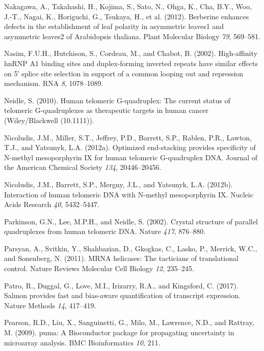 \documentclass[12pt,a4paper,]{report}
\begin{document}
\leavevmode\hypertarget{ref-Nakagawa2012}{}%
Nakagawa, A., Takahashi, H., Kojima, S., Sato, N., Ohga, K., Cha, B.Y.,
Woo, J.-T., Nagai, K., Horiguchi, G., Tsukaya, H., et al. (2012).
Berberine enhances defects in the establishment of leaf polarity in
asymmetric leaves1 and asymmetric leaves2 of Arabidopsis thaliana. Plant
Molecular Biology \emph{79}, 569--581.

\leavevmode\hypertarget{ref-Nasim2002}{}%
Nasim, F.U.H., Hutchison, S., Cordeau, M., and Chabot, B. (2002).
High-affinity hnRNP A1 binding sites and duplex-forming inverted repeats
have similar effects on 5′ splice site selection in support of a common
looping out and repression mechanism. RNA \emph{8}, 1078--1089.

\leavevmode\hypertarget{ref-Neidle2010}{}%
Neidle, S. (2010). Human telomeric G-quadruplex: The current status of
telomeric G-quadruplexes as therapeutic targets in human cancer
(Wiley/Blackwell (10.1111)).

\leavevmode\hypertarget{ref-Nicoludis2012}{}%
Nicoludis, J.M., Miller, S.T., Jeffrey, P.D., Barrett, S.P., Rablen,
P.R., Lawton, T.J., and Yatsunyk, L.A. (2012a). Optimized end-stacking
provides specificity of N-methyl mesoporphyrin IX for human telomeric
G-quadruplex DNA. Journal of the American Chemical Society \emph{134},
20446--20456.

\leavevmode\hypertarget{ref-Nicoludis2012a}{}%
Nicoludis, J.M., Barrett, S.P., Mergny, J.L., and Yatsunyk, L.A.
(2012b). Interaction of human telomeric DNA with N-methyl mesoporphyrin
IX. Nucleic Acids Research \emph{40}, 5432--5447.

\leavevmode\hypertarget{ref-Parkinson2002}{}%
Parkinson, G.N., Lee, M.P.H., and Neidle, S. (2002). Crystal structure
of parallel quadruplexes from human telomeric DNA. Nature \emph{417},
876--880.

\leavevmode\hypertarget{ref-Parsyan2011}{}%
Parsyan, A., Svitkin, Y., Shahbazian, D., Gkogkas, C., Lasko, P.,
Merrick, W.C., and Sonenberg, N. (2011). MRNA helicases: The tacticians
of translational control. Nature Reviews Molecular Cell Biology
\emph{12}, 235--245.

\leavevmode\hypertarget{ref-Patro2017}{}%
Patro, R., Duggal, G., Love, M.I., Irizarry, R.A., and Kingsford, C.
(2017). Salmon provides fast and bias-aware quantification of transcript
expression. Nature Methods \emph{14}, 417--419.

\leavevmode\hypertarget{ref-Pearson2009}{}%
Pearson, R.D., Liu, X., Sanguinetti, G., Milo, M., Lawrence, N.D., and
Rattray, M. (2009). puma: A Bioconductor package for propagating
uncertainty in microarray analysis. BMC Bioinformatics \emph{10}, 211.
\end{document}
